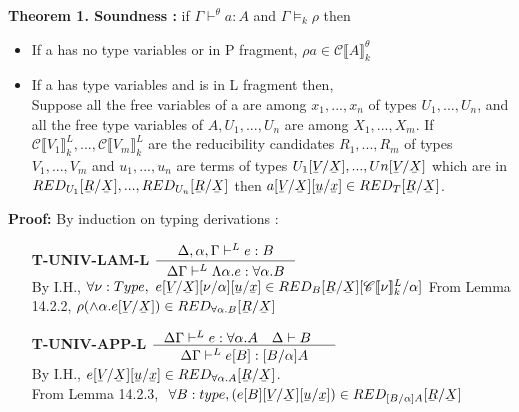 \documentclass[12pt]{article}
\newcommand{\ub}[1]{\underaccent{\bar}{#1}}
\newcommand{\llrr}[1]{\llbracket {#1} \rrbracket}
\begin{document}
\textbf{Theorem 1. Soundness : } if $\Gamma \vdash^\theta a:A$ and
$\Gamma \vDash_k \rho$ then\\
\begin{itemize}
\item If a has no type variables or in P fragment, $\rho a \in
  \mathscr{C}\llrr{A}^{\theta}_k$
\item If a has type variables and is in L fragment then, \\
Suppose all the free variables of a are among $x_1,...,x_n$ of types
$U_1,...,U_n$, and all the free type variables of $A,U_1,...,U_n$ are
among $X_1,...,X_m$. If $\mathscr{C}\llrr{V_1}^L_k,...,\mathscr{C}\llrr{V_m}^L_k$ are the reducibility candidates $R_1,...,R_m$ of types $V_1,...,V_m$ and $u_1,...,u_n$ are
terms of types $U_1[\ub{V}/\ub{X}],...,Un[\ub{V}/\ub{X}]$ which are in
$RED_{U_1} [\ub{R}/\ub{X}], . . . , RED_{U_n} [\ub{R}/\ub{X}]$ then  $ a[\ub{V}/\ub{X}][\ub{u}/\ub{x}] \in
RED_T[\ub{R}/\ub{X}]$.
\end{itemize}

\textbf{Proof:} By induction on typing derivations :\\

\begin{itemize}
\item [\textbf{T-UNIV-LAM-L}]$\inference{\Delta,\alpha,\Gamma \vdash^{L} e:B}{\Delta\Gamma
  \vdash^{L} \Lambda \alpha.e:\forall \alpha.B}$\\
By I.H., $\forall \nu:Type,\  e[\ub{V}/\ub{X}][\nu/\alpha][\ub{u}/\ub{x}] \in
RED_B[\ub{R}/\ub{X}][\mathscr{C}\llrr{\nu}^L_k/\alpha]$
From Lemma 14.2.2, $\rho (\wedge \alpha.e[\ub{V}/\ub{X}]) \in
RED_{\forall \alpha.B}[\ub{R}/\ub{X}]$
\item [\textbf{T-UNIV-APP-L}]$ \inference{\Delta\Gamma \vdash^{L} e:\forall \alpha.A \quad \Delta \vdash
B \quad }{\Delta\Gamma \vdash^{L} e[B]:[B/\alpha]A}  $\\
By I.H., $ e[\ub{V}/\ub{X}][\ub{u}/\ub{x}] \in RED_{\forall\alpha.A}[\ub{R}/\ub{X}]$.\\
From Lemma 14.2.3,  $\ \forall B:type,  (e[B][\ub{V}/\ub{X}][\ub{u}/\ub{x}]) \in
RED_{[B/\alpha]A}[\ub{R}/\ub{X}]$\\
\end{itemize}
\end{document}

